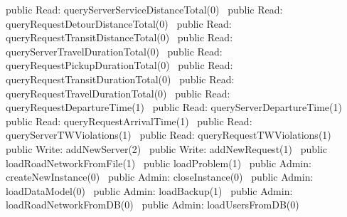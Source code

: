 public \LA{}Read: queryServerServiceDistanceTotal(0)~{\nwtagstyle{}}\RA{}
public \LA{}Read: queryRequestDetourDistanceTotal(0)~{\nwtagstyle{}}\RA{}
public \LA{}Read: queryRequestTransitDistanceTotal(0)~{\nwtagstyle{}}\RA{}
public \LA{}Read: queryServerTravelDurationTotal(0)~{\nwtagstyle{}}\RA{}
public \LA{}Read: queryRequestPickupDurationTotal(0)~{\nwtagstyle{}}\RA{}
public \LA{}Read: queryRequestTransitDurationTotal(0)~{\nwtagstyle{}}\RA{}
public \LA{}Read: queryRequestTravelDurationTotal(0)~{\nwtagstyle{}}\RA{}
public \LA{}Read: queryRequestDepartureTime(1)~{\nwtagstyle{}}\RA{}
public \LA{}Read: queryServerDepartureTime(1)~{\nwtagstyle{}}\RA{}
public \LA{}Read: queryRequestArrivalTime(1)~{\nwtagstyle{}}\RA{}
public \LA{}Read: queryServerTWViolations(1)~{\nwtagstyle{}}\RA{}
public \LA{}Read: queryRequestTWViolations(1)~{\nwtagstyle{}}\RA{}
\nwendcode{}\nwdocspar
{}
\nwenddocs{}\plusendmoddef
public \LA{}Write: addNewServer(2)~{\nwtagstyle{}}\RA{}
public \LA{}Write: addNewRequest(1)~{\nwtagstyle{}}\RA{}
public \LA{}loadRoadNetworkFromFile(1)~{\nwtagstyle{}}\RA{}
public \LA{}loadProblem(1)~{\nwtagstyle{}}\RA{}
\nwendcode{}\nwdocspar
{}
\nwenddocs{}\plusendmoddef
public \LA{}Admin: createNewInstance(0)~{\nwtagstyle{}}\RA{}
public \LA{}Admin: closeInstance(0)~{\nwtagstyle{}}\RA{}
public \LA{}Admin: loadDataModel(0)~{\nwtagstyle{}}\RA{}
public \LA{}Admin: loadBackup(1)~{\nwtagstyle{}}\RA{}
public \LA{}Admin: loadRoadNetworkFromDB(0)~{\nwtagstyle{}}\RA{}
public \LA{}Admin: loadUsersFromDB(0)~{\nwtagstyle{}}\RA{}
